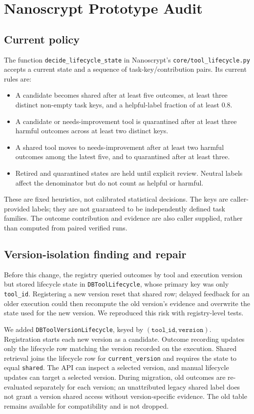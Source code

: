 \documentclass[11pt]{article}
\begin{document}
\section{Nanoscrypt Prototype Audit}
\subsection{Current policy}
The function \texttt{decide\_lifecycle\_state} in Nanoscrypt's \texttt{core/tool\_lifecycle.py} accepts a current state and a sequence of task-key/contribution pairs. Its current rules are:
\begin{itemize}[leftmargin=*]
  \item A candidate becomes shared after at least five outcomes, at least three distinct non-empty task keys, and a helpful-label fraction of at least 0.8.
  \item A candidate or needs-improvement tool is quarantined after at least three harmful outcomes across at least two distinct keys.
  \item A shared tool moves to needs-improvement after at least two harmful outcomes among the latest five, and to quarantined after at least three.
  \item Retired and quarantined states are held until explicit review. Neutral labels affect the denominator but do not count as helpful or harmful.
\end{itemize}
These are fixed heuristics, not calibrated statistical decisions. The keys are caller-provided labels; they are not guaranteed to be independently defined task families. The outcome contribution and evidence are also caller supplied, rather than computed from paired verified runs.

\subsection{Version-isolation finding and repair}
Before this change, the registry queried outcomes by tool and execution version but stored lifecycle state in \texttt{DBToolLifecycle}, whose primary key was only \texttt{tool\_id}. Registering a new version reset that shared row; delayed feedback for an older execution could then recompute the old version's evidence and overwrite the state used for the new version. We reproduced this risk with registry-level tests.

We added \texttt{DBToolVersionLifecycle}, keyed by $(\texttt{tool\_id},\texttt{version})$. Registration starts each new version as a candidate. Outcome recording updates only the lifecycle row matching the version recorded on the execution. Shared retrieval joins the lifecycle row for \texttt{current\_version} and requires the state to equal \texttt{shared}. The API can inspect a selected version, and manual lifecycle updates can target a selected version. During migration, old outcomes are re-evaluated separately for each version; an unattributed legacy shared label does not grant a version shared access without version-specific evidence. The old table remains available for compatibility and is not dropped.
\end{document}
